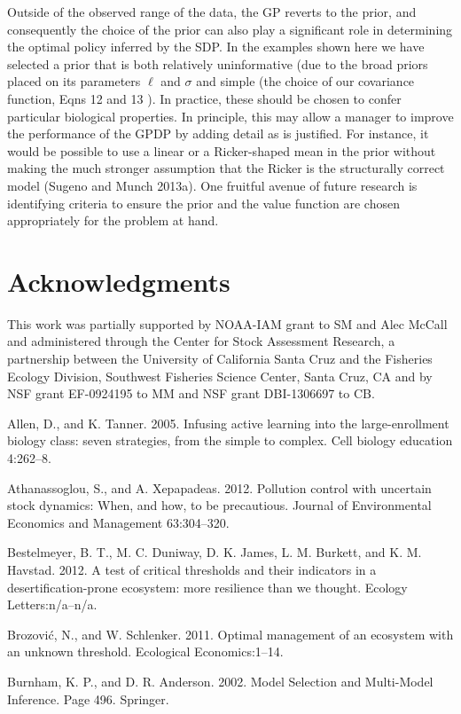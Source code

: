 \documentclass[author-year, 12pt,review]{components/elsarticle} %
\begin{document}
Outside of the observed range of the data, the GP reverts to the prior,
and consequently the choice of the prior can also play a significant
role in determining the optimal policy inferred by the SDP. In the
examples shown here we have selected a prior that is both relatively
uninformative (due to the broad priors placed on its parameters $\ell$
and $\sigma$ and simple (the choice of our covariance function, Eqns 12
and 13 ). In practice, these should be chosen to confer particular
biological properties. In principle, this may allow a manager to improve
the performance of the GPDP by adding detail as is justified. For
instance, it would be possible to use a linear or a Ricker-shaped mean
in the prior without making the much stronger assumption that the Ricker
is the structurally correct model (Sugeno and Munch 2013a). One fruitful
avenue of future research is identifying criteria to ensure the prior
and the value function are chosen appropriately for the problem at hand.

\section{Acknowledgments}\label{acknowledgments}

This work was partially supported by NOAA-IAM grant to SM and Alec
McCall and administered through the Center for Stock Assessment
Research, a partnership between the University of California Santa Cruz
and the Fisheries Ecology Division, Southwest Fisheries Science Center,
Santa Cruz, CA and by NSF grant EF-0924195 to MM and NSF grant
DBI-1306697 to CB.

Allen, D., and K. Tanner. 2005. Infusing active learning into the
large-enrollment biology class: seven strategies, from the simple to
complex. Cell biology education 4:262--8.

Athanassoglou, S., and A. Xepapadeas. 2012. Pollution control with
uncertain stock dynamics: When, and how, to be precautious. Journal of
Environmental Economics and Management 63:304--320.

Bestelmeyer, B. T., M. C. Duniway, D. K. James, L. M. Burkett, and K. M.
Havstad. 2012. A test of critical thresholds and their indicators in a
desertification-prone ecosystem: more resilience than we thought.
Ecology Letters:n/a--n/a.

Brozović, N., and W. Schlenker. 2011. Optimal management of an ecosystem
with an unknown threshold. Ecological Economics:1--14.

Burnham, K. P., and D. R. Anderson. 2002. Model Selection and
Multi-Model Inference. Page 496. Springer.
\end{document}
